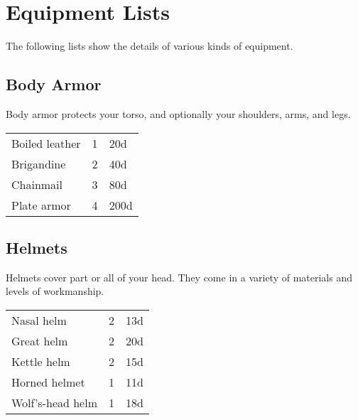 \section{Equipment Lists}

The following lists show the details of various kinds of equipment.

\subsection{Body Armor}

Body armor protects your torso, and optionally your shoulders,
arms, and legs.

\begin{center}
{
\begin{xtabular}{|l|l|l|}
Boiled leather & 1 & 20d \\
Brigandine & 2 & 40d \\
Chainmail & 3 & 80d \\
Plate armor & 4 & 200d \\
\hline
\end{xtabular}
}
\end{center}

\subsection{Helmets}

Helmets cover part or all of your head. They come in a variety
of materials and levels of workmanship.

\begin{center}
{
\begin{xtabular}{|l|l|l|}
Nasal helm & 2 & 13d \\
Great helm & 2 & 20d \\
Kettle helm & 2 & 15d \\
Horned helmet & 1 & 11d \\
Wolf's-head helm & 1 & 18d \\
\hline
\end{xtabular}
}
\end{center}


